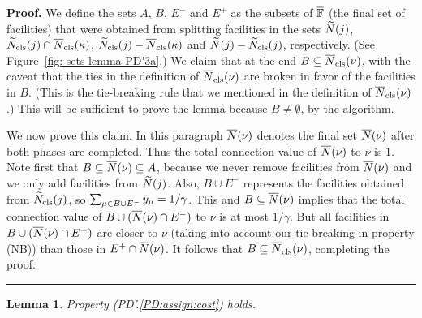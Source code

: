 \documentclass[oneside,final]{ucr}
\newtheorem{lemma}[theorem]{Lemma}
\newenvironment{proof}[1][Proof]{\textbf{#1.} }{\ \rule{0.5em}{0.5em}}
\begin{document}
\begin{proof}
  We define the sets $A$, $B$, $E^-$ and $E^+$ as the subsets of
  $\overline{\mathbb{F}}$ (the final set of facilities) that were obtained from
  splitting facilities in the sets ${\widetilde N}(j)$, ${\widetilde N}_{{\mbox{\scriptsize\rm cls}}}(j)\cap
  {\overline{N}}_{{\mbox{\scriptsize\rm cls}}}(\kappa)$, ${\widetilde N}_{{\mbox{\scriptsize\rm cls}}}(j) - {\overline{N}}_{{\mbox{\scriptsize\rm cls}}}(\kappa)$ and
  ${\widetilde N}(j) - {\widetilde N}_{{\mbox{\scriptsize\rm cls}}}(j)$, respectively.  (See
  Figure~\ref{fig: sets lemma PD'3a}.)  We claim that at the end
  $B\subseteq {\overline{N}}_{{\mbox{\scriptsize\rm cls}}}(\nu)$, with the caveat that the ties in the
  definition of ${\overline{N}}_{{\mbox{\scriptsize\rm cls}}}(\nu)$ are broken in favor of the
  facilities in $B$.  (This is the tie-breaking rule that we mentioned
  in the definition of ${\overline{N}}_{{\mbox{\scriptsize\rm cls}}}(\nu)$.)  This will be sufficient to
  prove the lemma because $B\neq\emptyset$, by the algorithm.

  We now prove this claim. In this paragraph ${\overline{N}}(\nu)$ denotes the
  final set ${\overline{N}}(\nu)$ after both phases are completed. Thus the total
connection value of ${\overline{N}}(\nu)$ to $\nu$ is $1$.
	Note first that
  $B\subseteq {\overline{N}}(\nu) \subseteq A$, because we never remove
  facilities from ${\overline{N}}(\nu)$ and we only add facilities from
  ${\widetilde N}(j)$.  Also, $B\cup E^-$ represents the facilities obtained
  from ${\widetilde N}_{{\mbox{\scriptsize\rm cls}}}(j)$, so $\sum_{\mu\in B\cup E^-} {\bar y}_{\mu} =
  1/\gamma$.  This and $B\subseteq {\overline{N}}(\nu)$ implies that the total
  connection value of $B\cup ({\overline{N}}(\nu)\cap E^-)$ to $\nu$ is at
  most $1/\gamma$. But all facilities in $B\cup ({\overline{N}}(\nu)\cap E^-)$
  are closer to $\nu$ (taking into account our tie breaking in property (NB))
 	than those in $E^+\cap {\overline{N}}(\nu)$. It follows
  that $B\subseteq {\overline{N}}_{{\mbox{\scriptsize\rm cls}}}(\nu)$, completing the proof.
\end{proof}


\begin{lemma}\label{lem: PD1: primary optimal}
  Property (PD'.\ref{PD:assign:cost}) holds.
\end{lemma}
\end{document}
